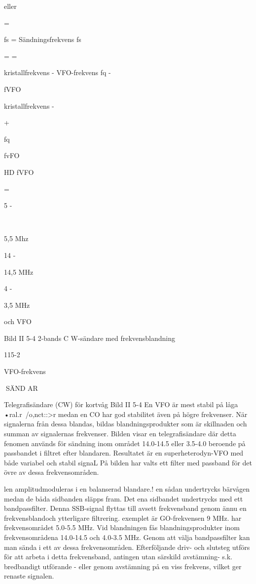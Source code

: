eller

=

fs =
Sändningsfrekvens
fs

=
=

kristallfrekvens - VFO-frekvens
fq -

fVFO

kristallfrekvens -

+

fq

fvFO

HD
fVFO

=

5 -

\

5,5 Mhz

14 -

14,5 MHz

4 -

3,5 MHz

och
VFO

Bild II 5-4 2-bands C W-sändare med frekvensblandning

115-2

VFO-frekvens

SÄND AR

Telegrafisändare (CW) för kortvåg
Bild II 5-4
En VFO är mest stabil på låga •ral.r\ /o,nct::>r
medan en CO har god stabilitet även på
högre frekvenser. När signalerna från dessa
blandas, bildas blandningsprodukter som är
skillnaden och summan av signalernas frekvenser. Bilden visar en telegrafisändare där
detta fenomen används för sändning inom
området 14.0-14.5 eller 3.5-4.0
beroende på passbandet i filtret efter blandaren.
Resultatet är en superheterodyn-VFO
med både variabel och stabil signaL På
bilden har valts ett filter med passband för
det övre av dessa frekvensområden.

len amplitudmoduleras i en balanserad blandare.! en sådan undertrycks bärvågen medan de båda sidbanden släpps fram. Det ena
sidbandet undertrycks med ett bandpassfilter. Denna SSB-signal flyttas till avsett frekvensband genom ännu en frekvensblandoch ytterligare filtrering.
exemplet är GO-frekvensen 9 MHz.
har frekvensområdet 5.0-5.5 MHz. Vid
blandningen fås blandningsprodukter inom
frekvensområdena 14.0-14.5 och 4.0-3.5
MHz. Genom att välja bandpassfilter kan
man sända i ett av dessa frekvensområden.
Efterföljande driv- och slutsteg utförs för
att arbeta i detta frekvensband, antingen
utan särskild avstämning- s.k. bredbandigt
utförande - eller genom avstämning på en
viss frekvens, vilket ger renaste signalen.

